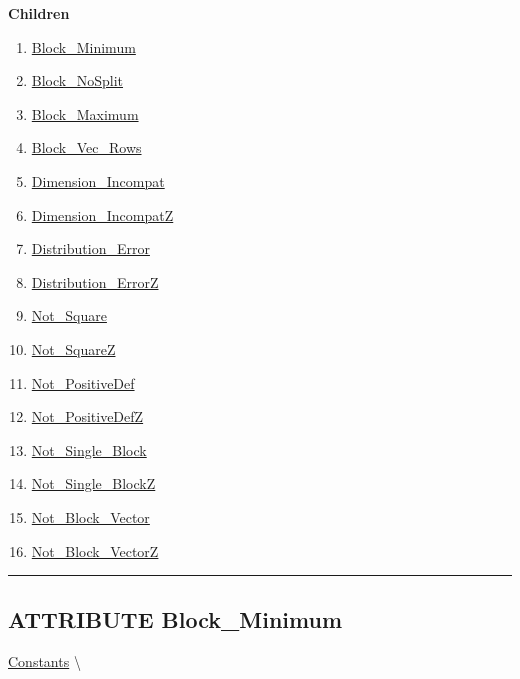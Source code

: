 \textbf{Children}
\begin{enumerate}
\item \hyperlink{ecldoc:pbblas.constants.block_minimum}{Block\_Minimum}
\item \hyperlink{ecldoc:pbblas.constants.block_nosplit}{Block\_NoSplit}
\item \hyperlink{ecldoc:pbblas.constants.block_maximum}{Block\_Maximum}
\item \hyperlink{ecldoc:pbblas.constants.block_vec_rows}{Block\_Vec\_Rows}
\item \hyperlink{ecldoc:pbblas.constants.dimension_incompat}{Dimension\_Incompat}
\item \hyperlink{ecldoc:pbblas.constants.dimension_incompatz}{Dimension\_IncompatZ}
\item \hyperlink{ecldoc:pbblas.constants.distribution_error}{Distribution\_Error}
\item \hyperlink{ecldoc:pbblas.constants.distribution_errorz}{Distribution\_ErrorZ}
\item \hyperlink{ecldoc:pbblas.constants.not_square}{Not\_Square}
\item \hyperlink{ecldoc:pbblas.constants.not_squarez}{Not\_SquareZ}
\item \hyperlink{ecldoc:pbblas.constants.not_positivedef}{Not\_PositiveDef}
\item \hyperlink{ecldoc:pbblas.constants.not_positivedefz}{Not\_PositiveDefZ}
\item \hyperlink{ecldoc:pbblas.constants.not_single_block}{Not\_Single\_Block}
\item \hyperlink{ecldoc:pbblas.constants.not_single_blockz}{Not\_Single\_BlockZ}
\item \hyperlink{ecldoc:pbblas.constants.not_block_vector}{Not\_Block\_Vector}
\item \hyperlink{ecldoc:pbblas.constants.not_block_vectorz}{Not\_Block\_VectorZ}
\end{enumerate}

\rule{\linewidth}{0.5pt}

\subsection*{\textsf{\colorbox{headtoc}{\color{white} ATTRIBUTE}
Block\_Minimum}}

\hypertarget{ecldoc:pbblas.constants.block_minimum}{}
\hspace{0pt} \hyperlink{ecldoc:PBblas.Constants}{Constants} \textbackslash 

